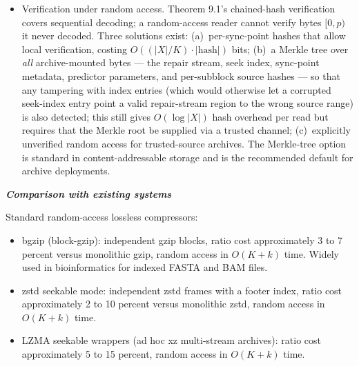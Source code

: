 \documentclass[
]{article}
\begin{document}
\begin{itemize}
  $\overline{|\tau|_{\text{crossed}}}$ is the average length of
  crossed tokens (bounded above by $\max_\tau |\tau|$). For
  $K \gg \max_\tau |\tau|$ this is negligible; for $K$ comparable to
  $\max_\tau |\tau|$ the worst-case fractional overhead approaches
  $8 \cdot \max_\tau|\tau| / K$ bits per source byte, which can be
  substantial. Specifically, $K = 4$ KiB and a worst-case
  $\max_\tau|\tau| = 1$ KiB give a worst-case overhead bound of
  $2$ bits per source byte (25\% of an 8 bits/byte raw source);
  in practice the average crossed token is shorter than the maximum,
  and the typical overhead is a few per-cent on natural data. A
  non-uniform sync-point variant that aligns boundaries to token
  edges instead is also available, at the cost of storing byte
  offsets in the seek index (Definition 10.3's non-uniform spacing
  case, adding $\lceil \log_2 |X|\rceil$ bits per entry); the
  random-access cost then follows the non-uniform branch of
  Theorem 10.3 ($O(\log(|X|/K) \cdot (\log |X| + \log L(R)))$
  binary-search bits, including the per-entry source-position
  width).
\item
  Verification under random access. Theorem 9.1's chained-hash
  verification covers sequential decoding; a random-access reader
  cannot verify bytes $[0, p)$ it never decoded. Three solutions
  exist: (a)~per-sync-point hashes that allow local verification,
  costing $O((|X|/K) \cdot |\text{hash}|)$ bits; (b)~a Merkle tree
  over \emph{all} archive-mounted bytes --- the repair stream,
  seek index, sync-point metadata, predictor parameters, and
  per-subblock source hashes --- so that any tampering with index
  entries (which would otherwise let a corrupted seek-index entry
  point a valid repair-stream region to the wrong source range)
  is also detected; this still gives $O(\log |X|)$ hash overhead
  per read but requires that the Merkle root be supplied via a
  trusted channel; (c)~explicitly unverified random access for
  trusted-source archives. The Merkle-tree option is standard in
  content-addressable storage and is the recommended default for
  archive deployments.
\end{itemize}

\emph{\textbf{Comparison with existing systems}}

Standard random-access lossless compressors:

\begin{itemize}
\item
  bgzip (block-gzip): independent gzip blocks, ratio cost
  approximately 3 to 7 percent versus monolithic gzip, random access
  in $O(K + k)$ time. Widely used in bioinformatics for indexed FASTA
  and BAM files.
\item
  zstd seekable mode: independent zstd frames with a footer index,
  ratio cost approximately 2 to 10 percent versus monolithic zstd,
  random access in $O(K + k)$ time.
\item
  LZMA seekable wrappers (ad hoc xz multi-stream archives): ratio
  cost approximately 5 to 15 percent, random access in $O(K + k)$
  time.
\end{itemize}
\end{document}
